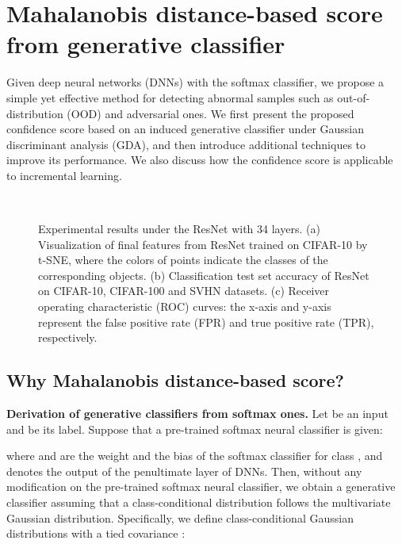 \documentclass{article}
\begin{document}
\section{{Mahalanobis distance-based score} from generative classifier} \label{sec:main_results}


Given deep neural networks (DNNs) with the softmax classifier,
we propose a simple yet effective method for detecting abnormal samples such as out-of-distribution (OOD) and adversarial ones.
We first present the proposed confidence score based on an induced generative classifier under Gaussian discriminant analysis (GDA),
and then introduce additional techniques to improve its performance.
We also discuss how the confidence score is applicable to incremental learning.

\begin{figure} [t] \centering
{} 
\,
\,
\caption{
Experimental results under the ResNet with 34 layers.
(a) Visualization of final features from ResNet trained on CIFAR-10 by t-SNE, where the colors of points indicate the classes of the corresponding objects. (b) Classification test set accuracy of ResNet on CIFAR-10, CIFAR-100 and SVHN datasets. (c) Receiver operating characteristic (ROC) curves: the x-axis and y-axis represent the false positive rate (FPR) and true positive rate (TPR), respectively.}
\label{fig:justification}
\end{figure}



\subsection{Why Mahalanobis distance-based score?} \label{sec:main_results_score}

{\bf Derivation of generative classifiers from softmax ones.}
Let  be an input and  be its label.
Suppose that
a pre-trained softmax neural classifier is given:

where  and  are the weight and the bias of the softmax classifier for class , and  denotes the output of the penultimate layer of DNNs.
Then, without any modification on the pre-trained softmax neural classifier,
we obtain a generative classifier assuming that a class-conditional distribution follows the multivariate Gaussian distribution.
Specifically, 
we define  class-conditional Gaussian distributions with a tied covariance : 
\end{document}
